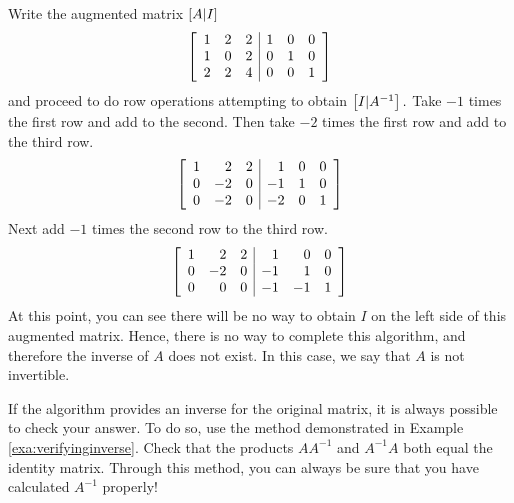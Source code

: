 \begin{solution} Write the augmented matrix $\left[ A|I\right] $
\begin{equation*}
\left[
\begin{array}{rrr|rrr}
1 & 2 & 2 & 1 & 0 & 0 \\
1 & 0 & 2 & 0 & 1 & 0 \\
2 & 2 & 4 & 0 & 0 & 1
\end{array}
\right]
\end{equation*}
and proceed to do row operations attempting to obtain $\left[
I|A^{-1}\right] .$ Take $-1$ times the first row and add to the
second. Then take $ -2 $ times the first row and add to the
third row.
\begin{equation*}
\left[ 
\begin{array}{rrr|rrr}
1 & 2 & 2 & 1 & 0 & 0 \\
0 & -2 & 0 & -1 & 1 & 0 \\
0 & -2 & 0 & -2 & 0 & 1
\end{array}
\right]
\end{equation*}
Next add $-1 $ times the second row to the third row.
\begin{equation*}
\left[ 
\begin{array}{rrr|rrr}
1 & 2 & 2 & 1 & 0 & 0 \\
0 & -2 & 0 & -1 & 1 & 0 \\
0 & 0 & 0 & -1 & -1 & 1
\end{array}
\right]
\end{equation*}
At this point, you can see there will be no way to obtain $I$ on the
left side of this augmented matrix.  Hence, there is no way to
complete this algorithm, and therefore the inverse of $A$ does not
exist. In this case, we say that $A$ is not invertible.
\end{solution}

If the algorithm provides an inverse for the original matrix, it is always possible to check your answer.
To do so, use the method demonstrated in Example \ref{exa:verifyinginverse}. Check that the products $AA^{-1}$ and $A^{-1}A$ both equal the 
identity matrix. Through this method, you can always be sure that you have calculated $A^{-1}$ properly!

